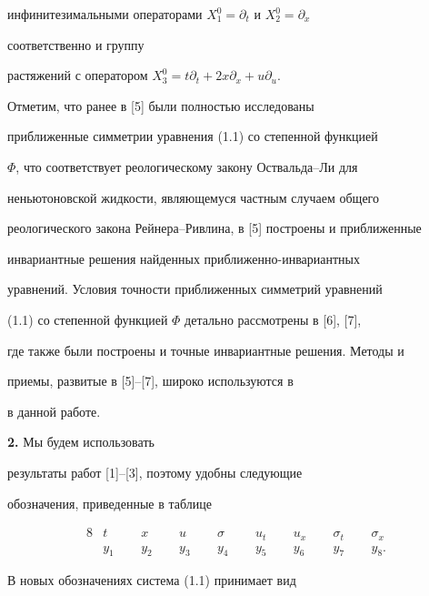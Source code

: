 инфинитезимальными операторами $X^0_1=\partial_t$ и $X^0_2=\partial_x$ 


соответственно и группу 


растяжений с оператором $X^0_3=t\partial_t+2x\partial_x+u\partial_u$. 


 


Отметим, что ранее в [5] были полностью исследованы 


приближенные симметрии уравнения (1.1) со степенной функцией 


$\Phi$, что соответствует реологическому закону Оствальда--Ли для 


неньютоновской жидкости, являющемуся частным случаем общего 


реологического закона Рейнера--Ривлина, в [5] построены и приближенные 


инвариантные решения найденных приближенно-инвариантных 


уравнений. Условия точности приближенных симметрий уравнений 


(1.1) со степенной функцией $\Phi$ детально рассмотрены в [6], [7], 


где также были построены и точные инвариантные решения. Методы и 


приемы, развитые в [5]--[7], широко используются в 


в данной работе. 


\medskip 


 


{\bf 2.} Мы будем использовать


результаты работ [1]--[3], поэтому удобны следующие


обозначения, приведенные в таблице


\begin{alignat*}{8} 


& t &\ \; & x & \ \; & u & \ \; & \sigma 


& \ \; & u_t & \ \; & u_x & \ \; & \sigma_t & \ \; 


& \sigma_x \\ 


& y_1 &\ \; & y_2 &\ \; & y_3 & \ \; & y_4 & \ \; 


& y_5 & \ \; & y_6 & \ \; & y_7 & \ \; & y_8. 


\end{alignat*} 


В новых обозначениях система (1.1) принимает вид 


